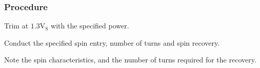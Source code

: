 % 
% 
%
 \subsubsection*{Procedure}
 \begin{compactenum}
   \item Trim at $\mathrm{1.3V_{S}}$ with the specified power.
   \item Conduct the specified spin entry, number of turns and spin recovery.
   \item Note the spin characteristics, and the number of turns required for the recovery.
   \end{compactenum}